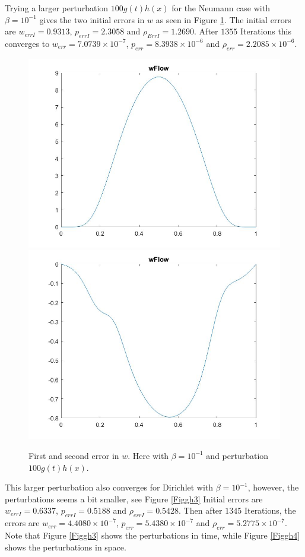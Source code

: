 \documentclass[11pt, a4paper]{article}
\theoremstyle{definition}
\begin{document}
Trying a larger perturbation $100g(t)h(x)$ for the Neumann case with $\beta =10^{-1}$ gives the two initial errors in $w$ as seen in Figure \ref{Figgh2}. The initial errors are $w_{errI}=0.9313$, $p_{errI}=2.3058$ and $\rho_{ErrI}=1.2690$. After $1355$ Iterations this converges to $w_{err}= 7.0739 \times 10^{-7}$, $p_{err}=8.3938 \times 10^{-6}$ and $\rho_{err} = 2.2085 \times 10^{-6}$. 

\begin{figure}[h]
	\includegraphics[scale=0.3]{wPertyt3.jpg}
	\includegraphics[scale=0.3]{wPertyt4.jpg}
	\caption{First and second error in $w$. Here with $\beta =10^{-1}$ and perturbation $100g(t)h(x)$.}
	\label{Figgh2}
\end{figure}
This larger perturbation also converges for Dirichlet with $\beta = 10^{-1}$, however, the perturbations seems a bit smaller, see Figure \ref*{Figgh3}
Initial errors are $w_{errI}=0.6337$, $p_{errI}=0.5188$ and $\rho_{errI}= 0.5428$.
Then after $1345$ Iterations, the errors are $w_{err}=4.4080 \times 10^{-7}$, $p_{err}=5.4380 \times 10^{-7}$ and $\rho_{err}=5.2775 \times 10^{-7}$. Note that Figure \ref{Figgh3} shows the perturbations in time, while Figure \ref{Figgh4} shows the perturbations in space.
\end{document}
